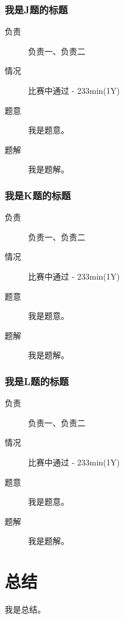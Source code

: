 \documentclass[a4paper, 11pt, nofonts, nocap, fancyhdr]{ctexart}
\newcommand{\problem}[1]{\subsubsection{#1}}
\begin{document}
\problem{我是J题的标题}

\begin{description}
\item[负责] 负责一、负责二
\item[情况] 比赛中通过 - 233min(1Y)
\item[题意]
我是题意。
\item[题解]
我是题解。
\end{description}

\problem{我是K题的标题}

\begin{description}
\item[负责] 负责一、负责二
\item[情况] 比赛中通过 - 233min(1Y)
\item[题意]
我是题意。
\item[题解]
我是题解。
\end{description}

\problem{我是L题的标题}

\begin{description}
\item[负责] 负责一、负责二
\item[情况] 比赛中通过 - 233min(1Y)
\item[题意]
我是题意。
\item[题解]
我是题解。
\end{description}

\section{总结}

我是总结。
\end{document}
